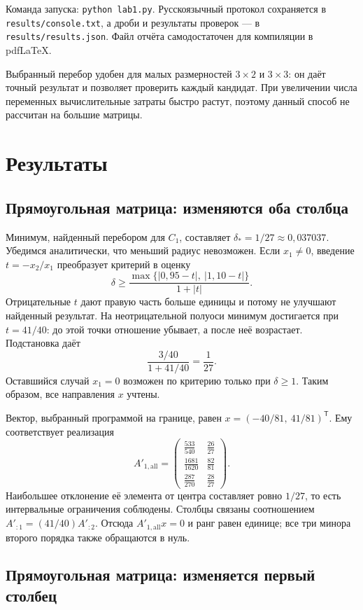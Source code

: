 \documentclass[12pt,a4paper]{article}
\begin{document}
Команда запуска: \texttt{python lab1.py}. Русскоязычный протокол
сохраняется в \texttt{results/console.txt}, а дроби и результаты
проверок --- в \texttt{results/results.json}.
Файл отчёта самодостаточен для компиляции в pdfLaTeX.

Выбранный перебор удобен для малых размерностей $3\times2$ и
$3\times3$: он даёт точный результат и позволяет проверить каждый
кандидат. При увеличении числа переменных вычислительные затраты
быстро растут, поэтому данный способ не рассчитан на большие матрицы.

\section{Результаты}

\subsection{Прямоугольная матрица: изменяются оба столбца}

Минимум, найденный перебором для $C_1$, составляет
$\delta_*=1/27\approx0{,}037037$. Убедимся аналитически,
что меньший радиус невозможен. Если $x_1\ne0$, введение
$t=-x_2/x_1$ преобразует критерий в оценку
\[
\delta\geq
\frac{\max\{|0{,}95-t|,\ |1{,}10-t|\}}{1+|t|}.
\]
Отрицательные $t$ дают правую часть больше единицы и потому
не улучшают найденный результат. На неотрицательной полуоси
минимум достигается при $t=41/40$: до этой точки отношение
убывает, а после неё возрастает. Подстановка даёт
\[
\frac{3/40}{1+41/40}=\frac1{27}.
\]
Оставшийся случай $x_1=0$ возможен по критерию только при
$\delta\geq1$. Таким образом, все направления $x$ учтены.

Вектор, выбранный программой на границе, равен
$x=(-40/81,\ 41/81)^\mathsf T$. Ему соответствует реализация
\[
A'_{1,\mathrm{all}}=
\begin{pmatrix}
\frac{533}{540}&\frac{26}{27}\\[2pt]
\frac{1681}{1620}&\frac{82}{81}\\[2pt]
\frac{287}{270}&\frac{28}{27}
\end{pmatrix}.
\]
Наибольшее отклонение её элемента от центра составляет ровно
$1/27$, то есть интервальные ограничения соблюдены.
Столбцы связаны соотношением $A'_{:1}=(41/40)A'_{:2}$.
Отсюда $A'_{1,\mathrm{all}}x=0$ и ранг равен единице;
все три минора второго порядка также обращаются в нуль.

\subsection{Прямоугольная матрица: изменяется первый столбец}
\end{document}
